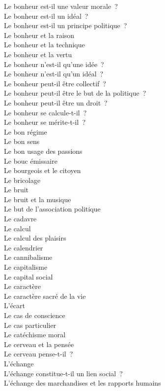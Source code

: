 \documentclass[a4paper,12pt]{article}
\begin{document}
Le bonheur est-il une valeur morale ? \\
Le bonheur est-il un idéal ? \\
Le bonheur est-il un principe politique ? \\
Le bonheur et la raison \\
Le bonheur et la technique \\
Le bonheur et la vertu \\
Le bonheur n'est-il qu'une idée ? \\
Le bonheur n'est-il qu'un idéal ? \\
Le bonheur peut-il être collectif ? \\
Le bonheur peut-il être le but de la politique ? \\
Le bonheur peut-il être un droit ? \\
Le bonheur se calcule-t-il ? \\
Le bonheur se mérite-t-il ? \\
Le bon régime \\
Le bon sens \\
Le bon usage des passions \\
Le bouc émissaire \\
Le bourgeois et le citoyen \\
Le bricolage \\
Le bruit \\
Le bruit et la musique \\
Le but de l'association politique \\
Le cadavre \\
Le calcul \\
Le calcul des plaisirs \\
Le calendrier \\
Le cannibalisme \\
Le capitalisme \\
Le capital social \\
Le caractère \\
Le caractère sacré de la vie \\
L'écart \\
Le cas de conscience \\
Le cas particulier \\
Le catéchisme moral \\
Le cerveau et la pensée \\
Le cerveau pense-t-il ? \\
L'échange \\
L'échange constitue-t-il un lien social ? \\
L'échange des marchandises et les rapports humains \\
\end{document}
